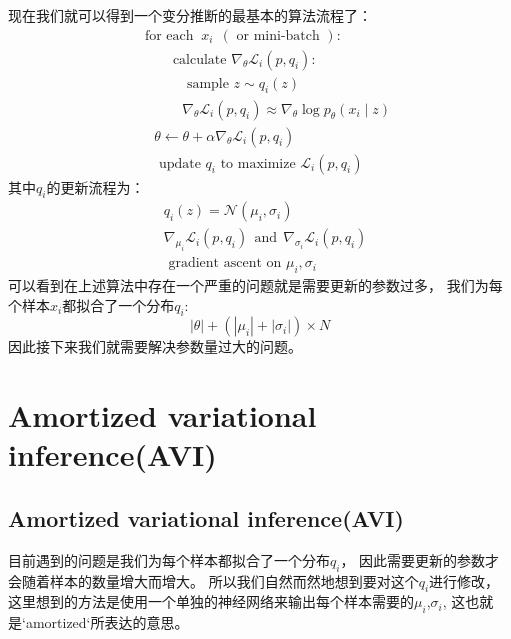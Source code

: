 现在我们就可以得到一个变分推断的最基本的算法流程了：
$$
\begin{aligned}
&\text { for each }\ x_{i}\ \  (\text { or mini-batch }): \\
&\quad\quad \text { calculate } \nabla_{\theta} \mathcal{L}_{i}\left(p, q_{i}\right): \\
&\quad\quad\quad \text { sample } z \sim q_{i}(z) \\
&\quad\quad\quad \nabla_{\theta} \mathcal{L}_{i}\left(p, q_{i}\right) \approx \nabla_{\theta} \log p_{\theta}\left(x_{i} \mid z\right) \\
&\quad\theta \leftarrow \theta+\alpha \nabla_{\theta} \mathcal{L}_{i}\left(p, q_{i}\right) \\
&\quad\text { update } q_{i} \text { to maximize } \mathcal{L}_{i}\left(p, q_{i}\right)
\end{aligned}
$$
其中$q_i$的更新流程为：
$$
\begin{aligned}
&q_{i}(z)=\mathcal{N}\left(\mu_{i}, \sigma_{i}\right) \\
&\nabla_{\mu_{i}} \mathcal{L}_{i}\left(p, q_{i}\right)\ \ \text {and}\ \ \nabla_{\sigma_{i}} \mathcal{L}_{i}\left(p, q_{i}\right) \\
&\text { gradient ascent on } \mu_{i}, \sigma_{i}
\end{aligned}
$$
可以看到在上述算法中存在一个严重的问题就是需要更新的参数过多，
我们为每个样本$x_i$都拟合了一个分布$q_i$:
$$
|\theta|+(|\mu_i|+|\sigma_i|)\times N
$$
因此接下来我们就需要解决参数量过大的问题。


\section{Amortized variational inference(AVI)}

\subsection{Amortized variational inference(AVI)}

目前遇到的问题是我们为每个样本都拟合了一个分布$q_i$，
因此需要更新的参数才会随着样本的数量增大而增大。
所以我们自然而然地想到要对这个$q_i$进行修改，
这里想到的方法是使用一个单独的神经网络来输出每个样本需要的$\mu_i$,$\sigma_i$,
这也就是`amortized`所表达的意思。




